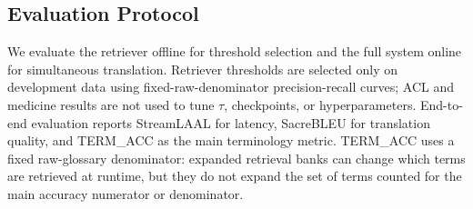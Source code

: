 \subsection{Evaluation Protocol}
\label{sec:evaluation_protocol}

We evaluate the retriever offline for threshold selection and the full system online for simultaneous translation. Retriever thresholds are selected only on development data using fixed-raw-denominator precision-recall curves; ACL and medicine results are not used to tune $\tau$, checkpoints, or hyperparameters. End-to-end evaluation reports StreamLAAL for latency, SacreBLEU for translation quality, and TERM\_ACC as the main terminology metric. TERM\_ACC uses a fixed raw-glossary denominator: expanded retrieval banks can change which terms are retrieved at runtime, but they do not expand the set of terms counted for the main accuracy numerator or denominator.
